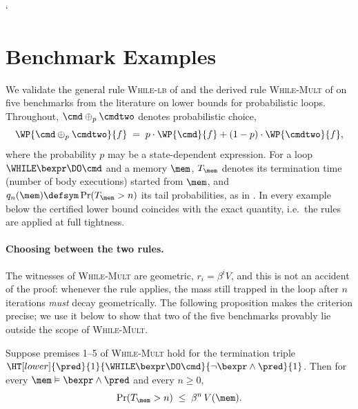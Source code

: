 \newpage

{\catcode` \gdef\lt{\mathrel{<}}}

\section{Benchmark Examples}\label{app:benchmarks}

We validate the general rule \textsc{While-lb} of 
and the derived rule \textsc{While-Mult} of  on five
benchmarks from the literature on lower bounds for probabilistic loops.
Throughout, $\cmd \oplus_{p} \cmdtwo$ denotes probabilistic choice,
\[
  \WP{\cmd \oplus_{p} \cmdtwo}{f}
  \;=\;
  p \cdot \WP{\cmd}{f} + (1-p)\cdot\WP{\cmdtwo}{f},
\]
where the probability $p$ may be a state-dependent expression. For a loop
$\WHILE\bexpr\DO\cmd$ and a memory $\mem$, $T_\mem$ denotes its termination
time (number of body executions) started from $\mem$, and
$q_n(\mem) \defsym \Pr(T_\mem > n)$ its tail probabilities, as in
. In every example below the certified lower
bound coincides with the exact quantity, i.e.\ the rules are applied at full
tightness.

\paragraph{Choosing between the two rules.}
The witnesses of \textsc{While-Mult} are geometric, $r_i = \beta^i V$, and this
is not an accident of the proof: whenever the rule applies, the mass still
trapped in the loop after $n$ iterations \emph{must} decay geometrically. The
following proposition makes the criterion precise; we use it below to show
that two of the five benchmarks provably lie outside the scope of
\textsc{While-Mult}.

\begin{proposition}%
\label{prop:geo-tail}
Suppose premises 1--5 of \textsc{While-Mult} hold for the termination triple
$\HT[lower]{\pred}{1}{\WHILE\bexpr\DO\cmd}{\neg\bexpr\land\pred}{1}$.
Then for every $\mem \vDash \bexpr\land\pred$ and every $n \geq 0$,
\[
  \Pr(T_\mem > n) \;\leq\; \beta^{n}\, V(\mem).
\]
\end{proposition}

